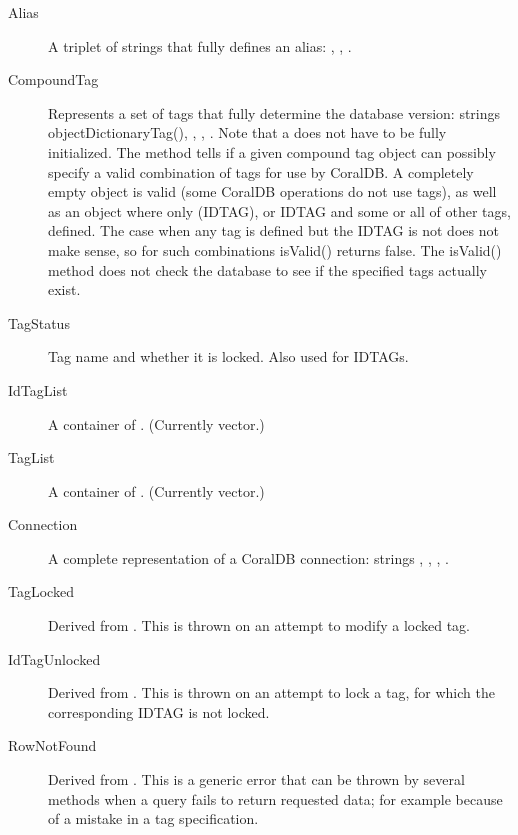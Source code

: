 \begin{description}
  
\item[Alias] A triplet of strings that fully defines an alias:
  , , .
  
\item[CompoundTag] Represents a set of tags that fully determine the
  database version: strings {\rm \code{}objectDictionaryTag()},
  , , .  Note
  that a  does not have to be fully initialized.
  The  method tells if a given compound tag object can
  possibly specify a valid combination of tags for use by CoralDB.  A
  completely empty object is valid (some CoralDB operations do not use
  tags), as well as an object where only 
  (IDTAG), or IDTAG and some or all of other tags, defined.  The case
  when any tag is defined but the IDTAG is not does not make sense, so
  for such combinations isValid() returns false.  The isValid() method
  does not check the database to see if the specified tags actually
  exist.

\item[TagStatus] Tag name and whether it is locked. Also used for IDTAGs.

\item[IdTagList] A container of . (Currently vector.)

\item[TagList] A container of . (Currently vector.)

\item[Connection] A complete representation of a CoralDB connection:
  strings , , ,
  .

\item[TagLocked] Derived from . This is
  thrown on an attempt to modify a locked tag.
  
\item[IdTagUnlocked] Derived from . This is
  thrown on an attempt to lock a tag, for which the corresponding
  IDTAG is not locked.
  
\item[RowNotFound] Derived from .
%
%
  This is a generic error that can be thrown by several
  methods when a query fails to return requested data; for example
  because of a mistake in a tag specification.

\end{description}

